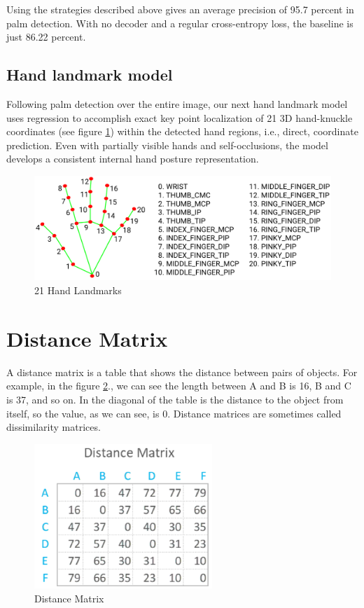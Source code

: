 Using the strategies described above gives an average precision of 95.7 percent in palm detection. With no decoder and a regular cross-entropy loss, the baseline is just 86.22 percent.

\subsection{Hand landmark model}
Following palm detection over the entire image, our next hand landmark model uses regression to accomplish exact key point localization of 21 3D hand-knuckle coordinates (see figure \ref{fig:Chap3-HandLandMark}) within the detected hand regions, i.e., direct, coordinate prediction. Even with partially visible hands and self-occlusions, the model develops a consistent internal hand posture representation.
\begin{figure}[H]
	\centering
	\includegraphics[width=\textwidth]{img/Chap3/HandLandMark}
	\caption{ 21 Hand Landmarks }
	\label{fig:Chap3-HandLandMark}
\end{figure}


\section{Distance Matrix}

A distance matrix \cite{DistanceMatrix} is a table that shows the distance between pairs of objects. For example, in the figure \ref{fig:Chap3-DM}., we can see the length between A and B is 16, B and C is 37, and so on. In the diagonal of the table is the distance to the object from itself, so the value, as we can see, is 0. Distance matrices are sometimes called dissimilarity matrices.

\begin{figure}[H]
	\centering
	\includegraphics[width=0.6\textwidth]{img/Chap3/DM}
	\caption{ Distance Matrix }
	\label{fig:Chap3-DM}
\end{figure}

